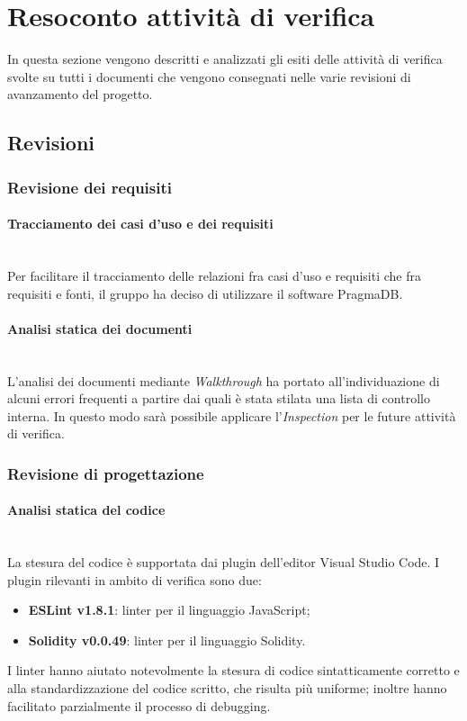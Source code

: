 \section{Resoconto attività di verifica}
In questa sezione vengono descritti e analizzati gli esiti delle attività
di verifica svolte su tutti i documenti che vengono consegnati nelle varie 
revisioni di avanzamento del progetto.
\subsection{Revisioni}
\subsubsection{Revisione dei requisiti}
\paragraph{Tracciamento dei casi d'uso e dei requisiti}\mbox{}\\
Per facilitare il tracciamento delle relazioni fra casi d'uso e requisiti che
fra requisiti e fonti, il gruppo ha deciso di utilizzare il software PragmaDB.

\paragraph{Analisi statica dei documenti}\mbox{}\\
L'analisi dei documenti mediante \textit{Walkthrough}\glo{} ha portato 
all'individuazione di alcuni errori frequenti a partire dai quali è stata 
stilata una lista di controllo interna. In questo modo sarà possibile applicare
l'\textit{Inspection}\glo{} per le future attività di verifica.

\subsubsection{Revisione di progettazione}
\paragraph{Analisi statica del codice}\mbox{}\\
La stesura del codice è supportata dai plugin dell'editor Visual Studio Code. I plugin rilevanti in ambito di verifica sono due:
\begin{itemize}
	\item \textbf{ESLint v1.8.1}: linter per il linguaggio JavaScript;
	\item \textbf{Solidity v0.0.49}: linter per il linguaggio Solidity.
\end{itemize}
 I linter hanno aiutato notevolmente la stesura di codice sintatticamente corretto e alla standardizzazione del codice scritto, che risulta più uniforme; inoltre hanno facilitato parzialmente il processo di debugging.
 

